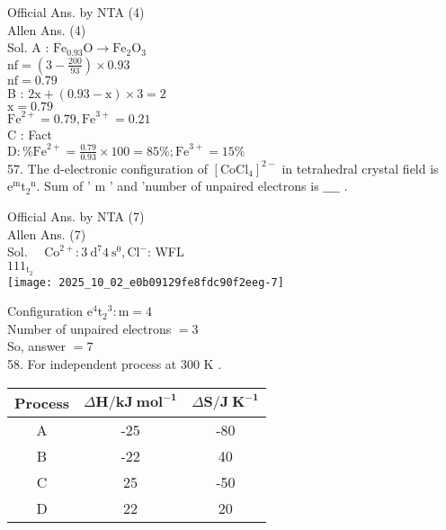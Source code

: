 \documentclass[10pt]{article}
\begin{document}
Official Ans. by NTA (4)\\
Allen Ans. (4)\\
Sol. A : \(\mathrm{Fe}_{0.93} \mathrm{O} \rightarrow \mathrm{Fe}_{2} \mathrm{O}_{3}\)\\
\(\mathrm{nf}=\left(3-\frac{200}{93}\right) \times 0.93\)\\
\(\mathrm{nf}=0.79\)\\
B : \(2 \mathrm{x}+(0.93-\mathrm{x}) \times 3=2\)\\
\(\mathrm{x}=0.79\)\\
\(\mathrm{Fe}^{2+}=0.79, \mathrm{Fe}^{3+}=0.21\)\\
C : Fact\\
\(\mathrm{D}: \% \mathrm{Fe}^{2+}=\frac{0.79}{0.93} \times 100=85 \% ; \mathrm{Fe}^{3+}=15 \%\)\\
57. The d-electronic configuration of \(\left[\mathrm{CoCl}_{4}\right]^{2-}\) in tetrahedral crystal field is \(\mathrm{e}^{\mathrm{m}} \mathrm{t}_{2}{ }^{\mathrm{n}}\). Sum of ' m ' and 'number of unpaired electrons is \(\_\_\_\_\) .

Official Ans. by NTA (7)\\
Allen Ans. (7)\\
Sol. \(\quad \mathrm{Co}^{2+}: 3 \mathrm{~d}^{7} 4 \mathrm{~s}^{0}, \mathrm{Cl}^{-}\): WFL\\
\(111_{\mathrm{t}_{2}}\)\\
\texttt{[image: 2025\_10\_02\_e0b09129fe8fdc90f2eeg-7]}

Configuration \(\mathrm{e}^{4} \mathrm{t}_{2}{ }^{3}: \mathrm{m}=4\)\\
Number of unpaired electrons \(=3\)\\
So, answer \(=7\)\\
58. For independent process at 300 K .

\begin{center}
\begin{tabular}{|c|c|c|}
\hline
Process & \(\Delta \mathbf{H} / \mathbf{k J ~ m o l}^{-\mathbf{1}}\) & \(\Delta \mathbf{S} / \mathbf{J ~ K}^{-\mathbf{1}}\) \\
\hline
A & -25 & -80 \\
\hline
B & -22 & 40 \\
\hline
C & 25 & -50 \\
\hline
D & 22 & 20 \\
\hline
\end{tabular}
\end{center}
\end{document}
